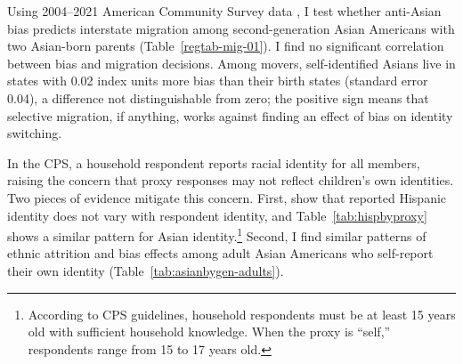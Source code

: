 Using 2004--2021 American Community Survey data \autocite{floodsarahIntegratedPublicUse2021}, I test whether anti-Asian bias predicts interstate migration among second-generation Asian Americans with two Asian-born parents (Table~\ref{regtab-mig-01}). I find no significant correlation between bias and migration decisions. Among movers, self-identified Asians live in states with 0.02 index units more bias than their birth states (standard error 0.04), a difference not distinguishable from zero; the positive sign means that selective migration, if anything, works against finding an effect of bias on identity switching.

In the CPS, a household respondent reports racial identity for all members, raising the concern that proxy responses may not reflect children's own identities. Two pieces of evidence mitigate this concern. First, \textcite{duncanIntermarriageIntergenerationalTransmission2011} show that reported Hispanic identity does not vary with respondent identity, and Table~\ref{tab:hispbyproxy} shows a similar pattern for Asian identity.\footnote{According to CPS guidelines, household respondents must be at least 15 years old with sufficient household knowledge. When the proxy is ``self,'' respondents range from 15 to 17 years old.} Second, I find similar patterns of ethnic attrition and bias effects among adult Asian Americans who self-report their own identity (Table~\ref{tab:asianbygen-adults}).

